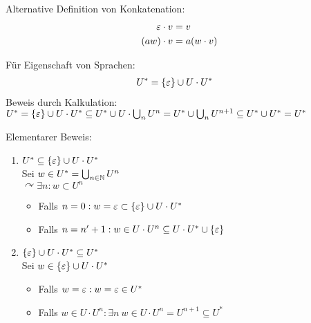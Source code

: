 Alternative Definition von Konkatenation:
\begin{align*}
	\varepsilon\cdot v &= v\\
	(aw)\cdot v &= a(w\cdot v)
\end{align*}
%
\begin{Bsp*} Für Eigenschaft von Sprachen:
	\begin{align*}
		U^* &= \{\varepsilon\}\cup U\cdot U^*
	\end{align*}
	Beweis durch Kalkulation:
	$U^*=\{\varepsilon\}\cup U\cdot U^*\subseteq U^*\cup U\cdot\bigcup_n U^n = U^*\cup\bigcup_n U^{n+1} \subseteq U^*\cup U^* = U^*$
\end{Bsp*}
Elementarer Beweis:
\begin{enumerate}[label={Zeige (\arabic*)},leftmargin=*,itemindent=*]
	\item $U^*\subseteq \{\varepsilon\}\cup U\cdot U^*$\\
	Sei $w\in U^*=\bigcup_{n\in\mathbb{N}} U^n$\\
	$\curvearrowright \exists n: w\subset U^n$
	\begin{itemize}
		\item Falls $n=0: w=\varepsilon\subset\{\varepsilon\}\cup U\cdot U^*$
		\item Falls $n= n'+1: w\in U\cdot U^n\subseteq U\cdot U^*\cup \{\varepsilon\}$
	\end{itemize}
	\item $\{\varepsilon\}\cup U\cdot U^*\subseteq U^*$\\
	Sei $w\in\{\varepsilon\} \cup U\cdot U^*$
	\begin{itemize}
		\item Falls $w=\varepsilon: w=\varepsilon\in U^*$
		\item Falls $w\in U\cdot U^n: \exists n\ w\in U\cdot U^n = U^{n+1}\subseteq U^*$
	\end{itemize}
\end{enumerate}